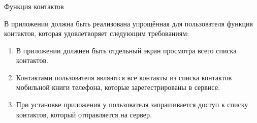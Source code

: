 \subsubsection{} Функция контактов
\label{sec:analysis:research:funcreq:contacts}

В приложении должна быть реализована упрощённая для пользователя функция контактов, которая удовлетворяет следующим требованиям:

\begin{enumerate}
	\item В приложении должнен быть отдельный экран просмотра всего списка контактов.
	\item Контактами пользователя являются все контакты из списка контактов мобильной книги телефона, которые зарегестрированы в сервисе.
	\item При установке приложения у пользователя запрашивается доступ к списку контактов, который отправляется на сервер.
\end{enumerate}